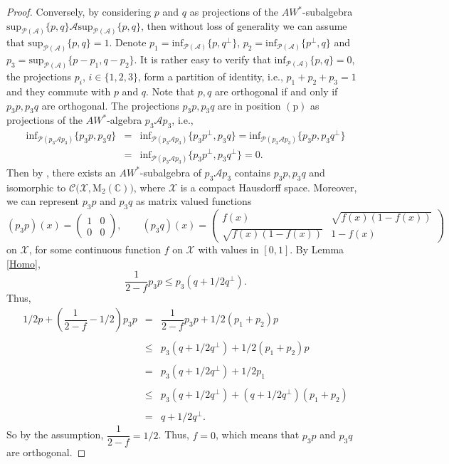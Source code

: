 \documentclass[12pt]{amsart}
\theoremstyle{definition}
\theoremstyle{remark}
\numberwithin{equation}{section}
\begin{document}
\begin{proof}
Conversely,  by considering $p$  and $q$ as projections of the $AW^*$-subalgebra    $\mathrm{sup}_{\mathcal{P(A)}}\{p,q\}\mathcal{A}\mathrm{sup}_{\mathcal{P(A)}}\{p,q\}$,   then without loss of generality we can  
assume that $\mathrm{sup}_{\mathcal{P(A)}}\{p,q\}=1$. Denote $p_1=\mathrm{inf}_{\mathcal{P(A)}}\{p,q^\perp\}$, $p_2=\mathrm{inf}_{\mathcal{P(A)}}\{p^\perp,q\}$ and $p_3=\mathrm{sup}_{\mathcal{P(A)}}\{p-p_1,q-p_2\}$.  It is rather easy to
verify that $\mathrm{inf}_{\mathcal{P(A)}}\{p,q\}=0$, the projections $p_i$, $i\in\{1,2,3\}$, form a partition of identity, i.e., $p_1+p_2+p_3=1$ and they  commute with $p$ and $q$. Note that $p, q$ are orthogonal if and only if $p_3p, p_3q$ are orthogonal. The projections $p_3p,p_3q$ are in position $(\mathrm{p})$ as projections of the $AW^*$-algebra $p_3\mathcal{A}p_3$, i.e.,
$$
\begin{array}{lllll}
	\mathrm{inf}_{\mathcal{P}(p_3\mathcal{A}p_3)}\{p_3p,p_3q\}&=&\mathrm{inf}_{\mathcal{P}(p_3\mathcal{A}p_3)}\{p_3p^\perp,p_3q\}
	=\mathrm{inf}_{\mathcal{P}(p_3\mathcal{A}p_3)}\{p_3p,p_3q^\perp\}\\
	&=&\mathrm{inf}_{\mathcal{P}(p_3\mathcal{A}p_3)}\{p_3p^\perp,p_3q^\perp\}=0.
\end{array}
$$ Then by \cite[Proposition 2.4, Proposition 2.5]{Hamhalter}, there exists an $AW^*$-subalgebra of $p_3\mathcal{A}p_3$ contains
$p_3p, p_3q$ and 
isomorphic to $\mathcal{C(X},\mathrm{M}_2(\mathbb{C}))$, where $\mathcal{X}$ is a compact  Hausdorff space.  Moreover,  we can
represent $p_3p$ and $p_3q$  as matrix valued functions $$(p_3p)(x)=\begin{pmatrix}
	1 & 0\\
	0 & 0
\end{pmatrix},\qquad   (p_3q)(x)=\begin{pmatrix}
	f(x) & \sqrt{f(x)(1-f(x))}\\
	\sqrt{f(x)(1-f(x))} & 1-f(x)
\end{pmatrix}$$ 
on $\mathcal{X}$, for some continuous function  $f$  on $\mathcal{X}$ with values in $[0, 1]$.   By Lemma \ref{Homo}, $$\dfrac{1}{2-f}p_3p\leq p_3(q+1/2q^\perp).$$
Thus, $$\begin{array}{llllllll}
1/2p+(\dfrac{1}{2-f}-1/2)p_3p  &=& \dfrac{1}{2-f}p_3p +1/2(p_1+p_2)p \\ \\
&\leq&   p_3(q+1/2q^\perp) + 1/2(p_1+p_2)p \\\\
&=& p_3(q+1/2q^\perp) + 1/2p_1 \\ \\
&\leq& p_3(q+1/2q^\perp) + (q+1/2q^\perp)(p_1+p_2)\\ \\
&=& q+1/2q^\perp.
\end{array}$$
 So by  the assumption,  $\dfrac{1}{2-f}=1/2$. Thus, $f=0$, which means that  $p_3p$ and $p_3q$ are orthogonal. 
\end{proof}
\end{document}
